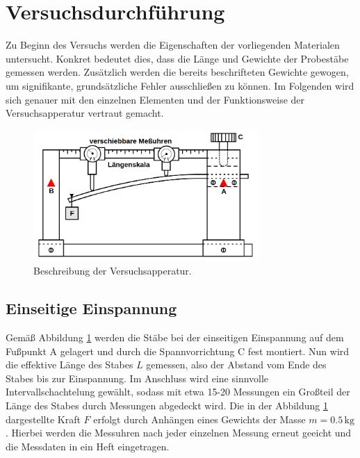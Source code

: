 %

%

\section{Versuchsdurchführung}
\label{sec:Versuchsdurchfuehrung}

Zu Beginn des Versuchs werden die Eigenschaften der vorliegenden Materialen untersucht. Konkret bedeutet dies,
dass die Länge und Gewichte der Probestäbe gemessen werden. Zusätzlich werden die bereits beschrifteten Gewichte gewogen,
um signifikante, grundsätzliche Fehler ausschließen zu können. Im Folgenden wird sich genauer mit den einzelnen Elementen
und der Funktionsweise der Versuchsapperatur vertraut gemacht.

\begin{figure}[H]
    \centering
    \includegraphics[height=5cm]{./content/Versuchsaufbau.png}
    \caption{Beschreibung der Versuchsapperatur.}
    \label{fig:Versuchsaufbau}
\end{figure}

\subsection{Einseitige Einspannung}
\label{sec:Einseitig}
Gemäß Abbildung \ref{fig:Versuchsaufbau} werden die Stäbe bei der einseitigen Einspannung auf dem Fußpunkt A gelagert
und durch die Spannvorrichtung C fest montiert. Nun wird die effektive Länge des Stabes $L$ gemessen, also der Abstand vom Ende des Stabes bis zur Einspannung.
Im Anschluss wird eine sinnvolle Intervallschachtelung gewählt, sodass mit etwa 15-20 Messungen ein Großteil der Länge des Stabes
durch Messungen abgedeckt wird. Die in der Abbildung \ref{fig:Versuchsaufbau} dargestellte Kraft $F$ erfolgt durch Anhängen eines
Gewichts der Masse $m = 0.5\,\unit{\kilo\gram}$. Hierbei werden die Messuhren nach jeder einzelnen Messung erneut geeicht und
die Messdaten in ein Heft eingetragen.

